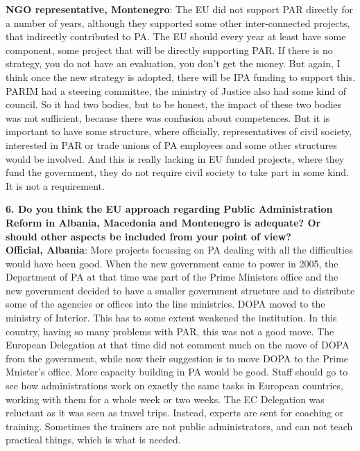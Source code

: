 \textbf{NGO representative, Montenegro}: The EU did not support PAR directly for a number of years, although they supported some other inter-connected projects, that indirectly contributed to PA. The EU should every year at least have some component, some project that will be directly supporting PAR. If there is no strategy, you do not have an evaluation, you don’t get the money. But again, I think once the new strategy is adopted, there will be IPA funding to support this. PARIM had a steering committee, the ministry of Justice also had some kind of council. So it had two bodies, but to be honest, the impact of these two bodies was not sufficient, because there was confusion about competences. But it is important to have some structure, where officially, representatives of civil society, interested in PAR or trade unions of PA employees and some other structures would be involved. And this is really lacking in EU funded projects, where they fund the government, they do not require civil society to take part in some kind. It is not a requirement.\newpage
\textbf{6. Do you think the EU approach regarding Public Administration Reform in Albania, Macedonia and Montenegro is adequate? Or should other aspects be included from your point of view?}\\
\textbf{Official, Albania}: More projects focussing on PA dealing with all the difficulties would have been good. When the new government came to power in 2005, the Department of PA at that time was part of the Prime Ministers office and the new government decided to have a smaller government structure and to distribute some of the agencies or offices into the line ministries. DOPA moved to the ministry of Interior. This has to some extent weakened the institution. In this country, having so many problems with PAR, this was not a good move. The European Delegation at that time did not comment much on the move of DOPA from the government, while now their suggestion is to move DOPA to the Prime Mnister’s office. More capacity building in PA would be good. Staff should go to see how administrations work on exactly the same tasks in European countries, working with them for a whole week or two weeks. The EC Delegation was reluctant as it was seen as travel trips. Instead, experts are sent for coaching or training. Sometimes the trainers are not public administrators, and can not teach practical things, which is what is needed.
